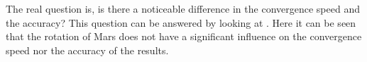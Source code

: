 
%

\noindent
The real question is, is there a noticeable difference in the convergence speed and the accuracy? This question can be answered by looking at .
Here it can be seen that the rotation of Mars does not have a significant influence on the convergence speed nor the accuracy of the results.


